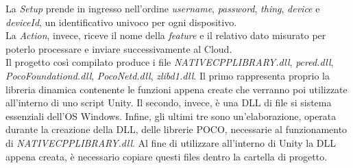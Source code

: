 La \textit{Setup} prende in ingresso nell'ordine \textit{username}, \textit{password}, \textit{thing}, \textit{device}  e \textit{deviceId}, un identificativo univoco per ogni dispositivo.\\
La \textit{Action}, invece, riceve il nome della \textit{feature} e il relativo dato misurato per poterlo processare e inviare successivamente al Cloud.\\
Il progetto così compilato produce i file \textit{NATIVECPPLIBRARY.dll}, \textit{pcred.dll}, \textit{PocoFoundationd.dll}, \textit{PocoNetd.dll}, \textit{zlibd1.dll}. Il primo rappresenta proprio la libreria dinamica contenente le funzioni appena create che verranno poi utilizzate all'interno di uno script Unity. Il secondo, invece, è una DLL di file si sistema essenziali dell'OS Windows. Infine, gli ultimi tre sono un’elaborazione, operata durante la creazione della DLL, delle librerie POCO, necessarie al funzionamento di  \textit{NATIVECPPLIBRARY.dll}. Al fine di utilizzare all'interno di Unity la DLL appena creata, è necessario copiare questi files dentro la cartella di progetto.


